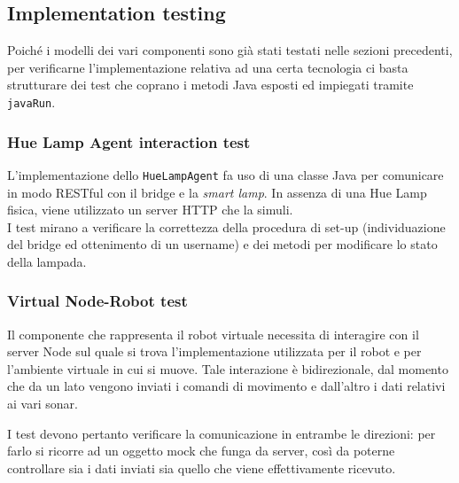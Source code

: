 \documentclass{../llncs}
\newcommand{\codescript}[1]{{\mbox{\small{\texttt{#1}}}}\xspace}
\begin{document}


\subsection{Implementation testing}
Poiché i modelli dei vari componenti sono già stati testati nelle sezioni precedenti, per verificarne l'implementazione relativa ad una certa tecnologia ci basta strutturare dei test che coprano i metodi Java esposti ed impiegati tramite \codescript{javaRun}.

\subsubsection{Hue Lamp Agent interaction test}
L'implementazione dello \texttt{HueLampAgent} fa uso di una classe Java per comunicare in modo RESTful con il bridge e la \textit{smart lamp}. In assenza di una Hue Lamp fisica, viene utilizzato un server HTTP che la simuli.\\



I test mirano a verificare la correttezza della procedura di set-up (individuazione del bridge ed ottenimento di un username) e dei metodi per modificare lo stato della lampada.


\subsubsection{Virtual Node-Robot test}
Il componente che rappresenta il robot virtuale necessita di interagire con il server Node sul quale si trova l'implementazione utilizzata per il robot e per l'ambiente virtuale in cui si muove. Tale interazione è bidirezionale, dal momento che da un lato vengono inviati i comandi di movimento e dall'altro i dati relativi ai vari sonar.

I test devono pertanto verificare la comunicazione in entrambe le direzioni: per farlo si ricorre ad un oggetto mock che funga da server, così da poterne controllare sia i dati inviati sia quello che viene effettivamente ricevuto.\\
\end{document}
